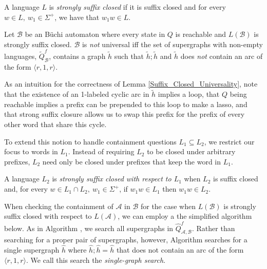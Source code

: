 \documentclass{LMCS}
\newcommand{\zug}[1]{\langle #1  \rangle}
\newcommand\buchi{B\"uchi }
\newcommand{\A}{{\mathcal A}}
\newcommand{\B}{{\mathcal B}}
\renewcommand{\graph}{\widetilde}
\newcommand{\superg}{\widehat}
\begin{document}
\begin{defi}
A language $L$ is \emph{strongly suffix closed} if it is suffix closed and for
every $w \in L,~ w_1 \in \Sigma^+$, we have that $w_1w \in L$.
\end{defi}

\begin{lem}\label{Suffix_Closed_Universality}
Let $\B$ be an \buchi automaton where every state in $Q$ is reachable and
$L(\B)$ is strongly suffix closed. $\B$ is \emph{not} universal iff the set of
supergraphs with non-empty languages, $\graph{Q}^f_\B$, contains a graph
$\graph{h}$ such that $\graph{h};\graph{h}$ and $\graph{h}$ does \emph{not}
contain an arc of the form $\zug{r,1,r}$.
\end{lem} 

As an intuition for the correctness of Lemma \ref{Suffix_Closed_Universality},
note that the existence of an 1-labeled cyclic arc in $\graph{h}$ implies a
loop, that $Q$ being reachable implies a prefix can be prepended to this loop to
make a lasso, and that strong suffix closure allows us to swap this prefix for
the prefix of every other word that share this cycle. 

To extend this notion to handle containment questions $L_1 \subseteq L_2$, we
restrict our focus to words in $L_1$. Instead of requiring $L_2$ to be closed
under arbitrary prefixes, $L_2$ need only be closed under prefixes that keep the
word in $L_1$.

\begin{defi}
A language $L_2$ is \emph{strongly suffix closed with respect to $L_1$} when
$L_2$ is suffix closed and, for every $w \in L_1 \cap L_2,~ w_1 \in \Sigma^+$, if
$w_1w \in L_1$ then $w_1w \in L_2$.
\end{defi}

When checking the containment of $\A$ in $\B$ for the case when $L(\B)$ is
strongly suffix closed with respect to $L(\A)$, we can employ a the simplified
algorithm below. As in Algorithm \linebreak[4]\DGS, we search all supergraphs in
$\superg{Q}^f_{\A,\B}$. Rather than searching for a proper pair of supergraphs,
however, Algorithm \SGS searches for a single supergraph $\superg{h}$ where
$\superg{h};\superg{h}=\superg{h}$ that does not contain an arc of the form
$\zug{r,1,r}$. We call this search the
\emph{single-graph search}.
\end{document}
